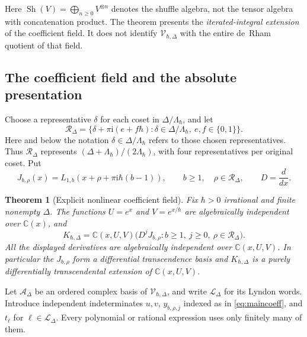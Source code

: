 \documentclass[11pt]{article}
\numberwithin{equation}{section}
\newtheorem{theorem}{Theorem}[section]
\theoremstyle{definition}
\theoremstyle{remark}
\newcommand{\C}{\mathbb C}
\newcommand{\ii}{\mathrm i}
\newcommand{\Sh}{\operatorname{Sh}}
\newcommand{\calV}{\mathcal V}
\newcommand{\qh}{\hbar}
\begin{document}
Here $\Sh(V)=\bigoplus_{n\geq0}V^{\otimes n}$ denotes the shuffle algebra,
not the tensor algebra with concatenation product. The theorem presents the
\emph{iterated-integral extension} of the coefficient field. It does not
identify $\calV_{\qh,\Delta}$ with the entire de~Rham quotient of that field.

\subsection{The coefficient field and the absolute presentation}

Choose a representative $\delta$ for each coset in $\Delta/\Lambda_\qh$, and
let
\begin{equation}\label{eq:representatives}
 \mathscr R_\Delta
 =\{\delta+\pi\ii(e+f\qh):\delta\in\Delta/\Lambda_\qh,\ e,f\in\{0,1\}\}.
\end{equation}
Here and below the notation $\delta\in\Delta/\Lambda_\qh$ refers to those
chosen representatives. Thus $\mathscr R_\Delta$ represents
$(\Delta+\Lambda_\qh)/(2\Lambda_\qh)$, with four representatives per original
coset. Put
\begin{equation}\label{eq:tower-intro}
 J_{b,\rho}(x)=L_{1,b}(x+\rho+\pi\ii\qh(b-1)),\qquad
 b\geq1,\quad\rho\in\mathscr R_\Delta,
 \qquad D=\frac{d}{dx}.
\end{equation}

\begin{theorem}[Explicit nonlinear coefficient field]\label{thm:maincoeff}
Fix $\qh>0$ irrational and finite nonempty $\Delta$. The functions
$U=e^x$ and $V=e^{x/\qh}$ are algebraically independent over $\C(x)$, and
\begin{equation}\label{eq:maincoeff}
 K_{\qh,\Delta}
 =\C(x,U,V)\bigl(D^jJ_{b,\rho}:b\geq1,\ j\geq0,
                                     \ \rho\in\mathscr R_\Delta\bigr).
\end{equation}
All the displayed derivatives are algebraically independent over
$\C(x,U,V)$. In particular the $J_{b,\rho}$ form a differential
transcendence basis and $K_{\qh,\Delta}$ is a purely differentially
transcendental extension of $\C(x,U,V)$.
\end{theorem}

Let $\mathscr A_\Delta$ be an ordered complex basis of $\calV_{\qh,\Delta}$,
and write $\mathscr L_\Delta$ for its Lyndon words. Introduce independent
indeterminates $u,v$, $y_{b,\rho,j}$ indexed as in \eqref{eq:maincoeff}, and
$t_\ell$ for $\ell\in\mathscr L_\Delta$. Every polynomial or rational
expression uses only finitely many of them.
\end{document}
